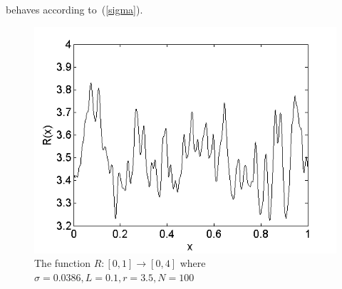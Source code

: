 behaves according to~(\ref{sigma}).
\begin{figure}[!h]
\caption[The function $R(x)$]{The function $R:[0,1]\to [0,4]$ where
  $\sigma=0.0386, L=0.1, r=3.5, N=100$}\label{fig:R}
	\begin{center}
		\includegraphics[scale=0.6]{figs/xi.png}
	\end{center}
\end{figure}

